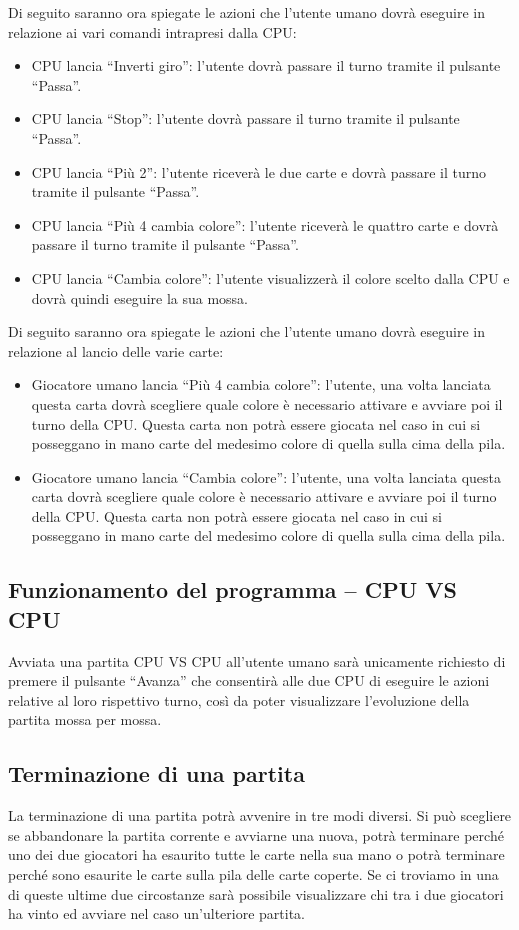 		Di seguito saranno ora spiegate le azioni che l’utente umano dovrà eseguire in relazione ai vari comandi intrapresi dalla CPU:
		\begin{itemize}
			\item CPU lancia ``Inverti giro'': l’utente dovrà passare il turno tramite il pulsante ``Passa''.
			\item CPU lancia ``Stop'': l’utente dovrà passare il turno tramite il pulsante ``Passa''.
			\item CPU lancia ``Più 2'': l’utente riceverà le due carte e dovrà passare il turno tramite il pulsante ``Passa''.
			\item CPU lancia ``Più 4 cambia colore'': l’utente riceverà le quattro carte e dovrà passare il turno tramite il pulsante ``Passa''.
			\item CPU lancia ``Cambia colore'': l’utente visualizzerà il colore scelto dalla CPU e dovrà quindi eseguire la sua mossa.
		\end{itemize}
		
		Di seguito saranno ora spiegate le azioni che l’utente umano dovrà eseguire in relazione al lancio delle varie carte:
		\begin{itemize}
			\item Giocatore umano lancia ``Più 4 cambia colore'': l’utente, una volta lanciata questa carta dovrà scegliere quale colore è necessario attivare e avviare poi il turno della CPU. Questa carta non potrà essere giocata nel caso in cui si posseggano in mano carte del medesimo colore di quella sulla cima della pila.
			\item Giocatore umano lancia ``Cambia colore'': l’utente, una volta lanciata questa carta dovrà scegliere quale colore è necessario attivare e avviare poi il turno della CPU. Questa carta non potrà essere giocata nel caso in cui si posseggano in mano carte del medesimo colore di quella sulla cima della pila.
		\end{itemize}
		
	\subsection{Funzionamento del programma – CPU VS CPU}
		Avviata una partita CPU VS CPU all’utente umano sarà unicamente richiesto di premere il pulsante ``Avanza'' che consentirà alle due CPU di eseguire le azioni relative al loro rispettivo turno, così da poter visualizzare l’evoluzione della partita mossa per mossa. 
		
	\subsection{Terminazione di una partita}	
		La terminazione di una partita potrà avvenire in tre modi diversi. Si può scegliere se abbandonare la partita corrente e avviarne una nuova, potrà terminare perché uno dei due giocatori ha esaurito tutte le carte nella sua mano o potrà terminare perché sono esaurite le carte sulla pila delle carte coperte. Se ci troviamo in una di queste ultime due circostanze sarà possibile visualizzare chi tra i due giocatori ha vinto ed avviare nel caso un’ulteriore partita.
